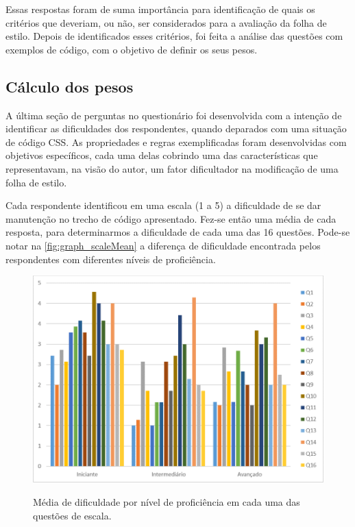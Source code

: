 

Essas respostas foram de suma importância para identificação de quais os critérios que deveriam, ou não, ser considerados para a avaliação da folha de estilo. Depois de identificados esses critérios, foi feita a análise das questões com exemplos de código, com o objetivo de definir os seus pesos.

\subsection{Cálculo dos pesos}

A última seção de perguntas no questionário foi desenvolvida com a intenção de identificar as dificuldades dos respondentes, quando deparados com uma situação de código CSS. As propriedades e regras exemplificadas foram desenvolvidas com objetivos específicos, cada uma delas cobrindo uma das características que representavam, na visão do autor, um fator dificultador na modificação de uma folha de estilo.

Cada respondente identificou em uma escala (1 a 5) a dificuldade de se dar manutenção no trecho de código apresentado. Fez-se então uma média de cada resposta, para determinarmos a dificuldade de cada uma das 16 questões.
Pode-se notar na \autoref{fig:graph_scaleMean} a diferença de dificuldade encontrada pelos respondentes com diferentes níveis de proficiência.

\begin{figure}[!htb]
	\centering
	\caption{Média de dificuldade por nível de proficiência em cada uma das questões de escala.}
	\includegraphics[width=1\textwidth]{./04-figuras/graph_scaleMean}
	\label{fig:graph_scaleMean}
\end{figure}

